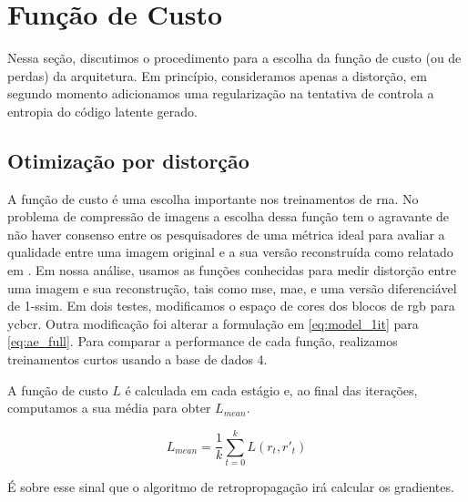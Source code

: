 \section {Função de Custo}
Nessa seção, discutimos o procedimento para a escolha da função de custo (ou de perdas) da arquitetura. Em princípio, consideramos apenas a distorção, em segundo momento adicionamos uma regularização na tentativa de controla a entropia do código latente gerado.

\subsection{Otimização por distorção}


A função de custo é uma escolha importante nos treinamentos de \acrshort{rna}. No problema de compressão de imagens a escolha dessa função tem o agravante de não haver consenso entre os pesquisadores de uma métrica ideal para avaliar a qualidade entre uma imagem original e a sua versão reconstruída como relatado em \cite{Priming2017Johnston,End2016Balle}.   
Em nossa análise, usamos as funções conhecidas para medir distorção entre uma imagem e sua reconstrução, tais como \acrshort{mse}, \acrshort{mae}, e uma versão diferenciável de 1-\acrshort{ssim}. Em dois testes, modificamos o espaço de cores dos blocos de \acrshort{rgb} para \acrshort{ycbcr}. Outra modificação foi alterar a formulação em \ref{eq:model_1it} para \ref{eq:ae_full}.  Para comparar a performance de cada função, realizamos treinamentos curtos usando a base de dados 4. 

A função de custo $L$ é calculada em cada estágio e, ao final das iterações, computamos a sua média para obter $L_{mean}$. 

\begin{equation}
L_{mean} = \frac{1}{k} \sum_{t=0}^k L(r_t,r'_t) 
\end{equation}

É sobre esse sinal que o algoritmo de retropropagação irá calcular os gradientes.





